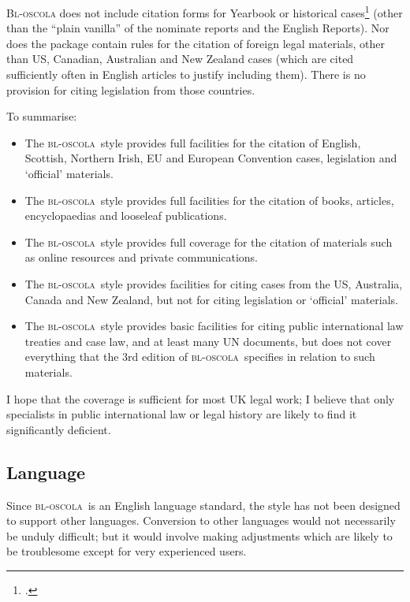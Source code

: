 \documentclass[a4paper,
               11pt,
	       DIV=1,			   
	       footinclude=false]
	      {scrartcl}
\newcommand{\oscola}{\textsc{bl-oscola}}
\begin{document}
\textsc{Bl-oscola}
does not include citation forms for Yearbook or historical
cases\footcite[20--21]{oscola} (other than the \enquote{plain vanilla}
of the nominate reports and the English Reports). Nor does the package
contain rules for the citation of foreign legal materials, other than US,
Canadian, Australian and New Zealand cases (which are cited
sufficiently often in English articles to justify including
them). There is no provision for citing legislation from those
countries.

To summarise:
\begin{itemize}
\item The \oscola\ style provides full facilities for the citation of
  English, Scottish, Northern Irish, EU and European Convention cases,
  legislation and `official' materials.
\item The \oscola\ style provides full facilities for the citation
  of books, articles, encyclopaedias and looseleaf publications.
\item The \oscola\ style provides full coverage for the citation of
  materials such as online resources and private communications.
\item The \oscola\ style provides facilities for citing cases from
  the US, Australia, Canada and New Zealand, but not for citing
  legislation or `official' materials.
\item The \oscola\ style provides basic facilities for citing public
  international law treaties and case law, and at least many UN documents, but does not cover
  everything that the 3rd edition of \oscola\ specifies in relation to
  such materials.
\end{itemize}
I hope that the coverage is sufficient for most UK legal work; I believe
that only specialists in public international law or legal history are
likely to find it significantly deficient.

\subsection{Language}

Since \oscola\ is an English language
standard, the style has not been designed to support other
languages. Conversion to other languages would not necessarily be
unduly difficult; but it would involve making adjustments which are
likely to be troublesome except for very experienced users.
\end{document}
